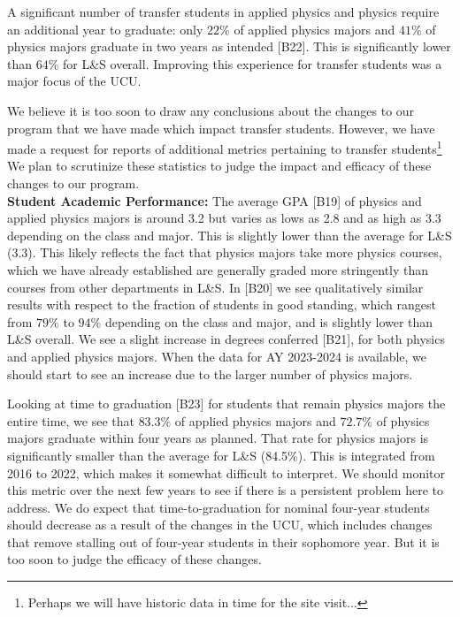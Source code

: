 \documentclass[12pt]{article}
\begin{document}
A significant number of transfer students in applied physics and
physics require an additional year to graduate: only $22\%$ of applied
physics majors and $41\%$ of physics majors graduate in two years as
intended [B22].  This is significantly lower than $64\%$ for L\&S overall.
Improving this experience for transfer students was a major focus of
the UCU.

We believe it is too soon to draw any conclusions about the changes to
our program that we have made which impact transfer students.
However, we have made a request for reports of additional metrics
pertaining to transfer students\footnote{Perhaps we will have historic
  data in time for the site visit...}  We plan to scrutinize these
statistics to judge the impact and efficacy of these changes to our
program.\\[3pt]

\noindent
{\bf Student Academic Performance:}
The average GPA [B19] of physics and applied physics majors is around
3.2 but varies as lows as 2.8 and as high as 3.3 depending on the
class and major.  This is slightly lower than the average for L\&S
(3.3).  This likely reflects the fact that physics majors take more
physics courses, which we have already established are generally
graded more stringently than courses from other departments in L\&S.
In [B20] we see qualitatively similar results with respect to the
fraction of students in good standing, which rangest from $79\%$ to
$94\%$ depending on the class and major, and is slightly lower than
L\&S overall.  We see a slight increase in degrees conferred [B21], for both physics
and applied physics majors.  When the data for AY 2023-2024 is
available, we should start to see an increase due to the larger number
of physics majors.

Looking at time to graduation [B23] for students that remain physics
majors the entire time, we see that $83.3\%$ of applied physics majors
and $72.7\%$ of physics majors graduate within four years as planned.
That rate for physics majors is significantly smaller than the average
for L\&S (84.5\%).  This is integrated from 2016 to 2022, which makes
it somewhat difficult to interpret.  We should monitor this metric
over the next few years to see if there is a persistent problem here
to address.  We do expect that time-to-graduation for nominal
four-year students should decrease as a result of the changes in the
UCU, which includes changes that remove stalling out of four-year
students in their sophomore year.  But it is too soon to judge the
efficacy of these changes.\\[3pt]
\end{document}
